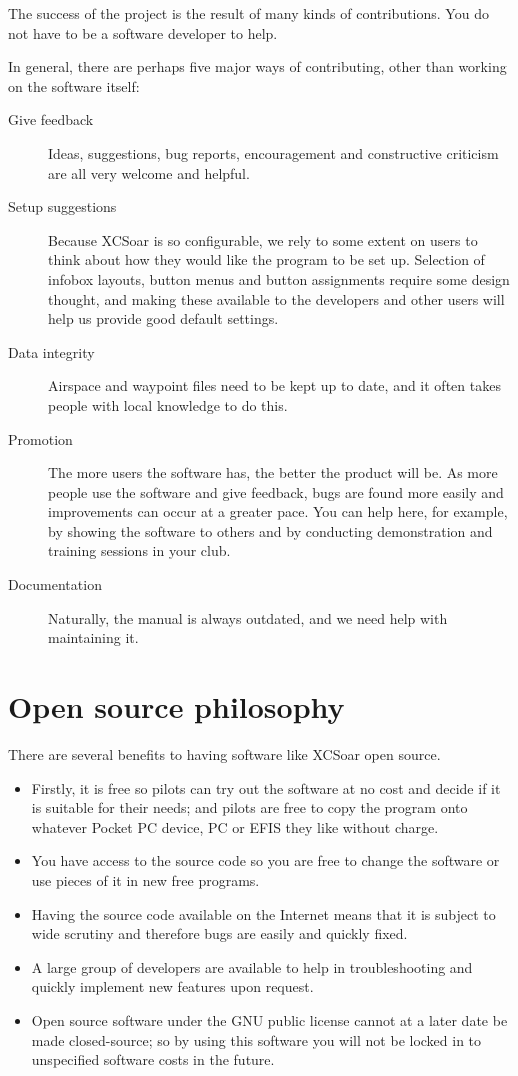 The success of the project is the result of many kinds of
contributions.  You do not have to be a software developer to help.

In general, there are perhaps five major ways of contributing, other
than working on the software itself:
\begin{description}
\item[Give feedback]
Ideas, suggestions, bug reports, encouragement and
constructive criticism are all very welcome and helpful.
\item[Setup suggestions]
Because XCSoar is so configurable, we rely to some extent on users to
think about how they would like the program to be set up.  Selection
of infobox layouts, button menus and button assignments require some
design thought, and making these available to the developers and other
users will help us provide good default settings.
\item[Data integrity]
Airspace and waypoint files need to be kept up to date, and it often
takes people with local knowledge to do this.
\item[Promotion]  The more users the software has, the better
 the product will be.  As more people use the software and give
 feedback, bugs are found more easily and improvements can occur at a
 greater pace.  You can help here, for example, by showing the
 software to others and by conducting demonstration and training
 sessions in your club.
\item[Documentation]  Naturally, the manual is always outdated, and we
  need help with maintaining it.
\end{description}


\section{Open source philosophy}

There are several benefits to having software like XCSoar open source.

\begin{itemize}
\item Firstly, it is free so pilots can try out the software at no
 cost and decide if it is suitable for their needs; and pilots are free
 to copy the program onto whatever Pocket PC device, PC or EFIS they like
 without charge.
\item You have access to the source code so you are free to change
 the software or use pieces of it in new free programs.
\item Having the source code available on the Internet means that it is
 subject to wide scrutiny and therefore bugs are easily and quickly fixed.
\item A large group of developers are available to help in troubleshooting
 and quickly implement new features upon request.
\item Open source software under the GNU public license cannot at a later
 date be made closed-source; so by using this software you will not be
 locked in to unspecified software costs in the future.
\end{itemize}

